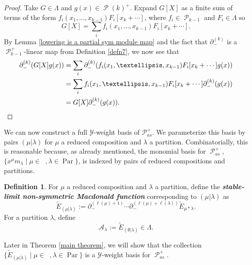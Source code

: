 \documentclass[11pt]{article}
\theoremstyle{definition}
\newtheorem{defi}[theo]{Definition}
\numberwithin{equation}{section}
\newcommand{\y}{{ \mathscr{Y} }}
\DeclareMathOperator{\sP}{\mathscr{P} }
\DeclareMathOperator{\Par}{\mathrm{Par}}
\DeclareMathOperator{\Compred}{\mathrm{Comp}^{\textit{red}}}
\begin{document}
\begin{proof}
    Take $G \in \Lambda$ and $g(x) \in \sP(k)^{+}$. Expand $G[X]$ as a finite sum of terms of the form $f_i(x_1,\ldots,x_{k-1})F_i[x_k + \cdots]$, where $f_i \in \sP_{k-1}$ and $F_i \in \Lambda$ so 
    $$G[X] = \sum_{i} f_i(x_1,\ldots,x_{k-1})F_i[x_k + \cdots].$$
    By Lemma \ref{lowering is a partial sym module map} and the fact that $\partial_{-}^{(k)}$ is a $\sP_{k-1}^{+}$-linear map from Definition \ref{defn7}, we now see that 
\begin{align*}
    \partial_{-}^{(k)}(G[X]g(x)) &= 
    \sum_{i} \partial_{-}^{(k)}( f_i(x_1,\ldots,x_{k-1})F_i[x_k + \cdots]g(x)) \\
    &= \sum_{i} f_i(x_1,\ldots,x_{k-1})F_i[x_k + \cdots]\partial_{-}^{(k)}(g(x)) \\
    &= G[X]\partial_{-}^{(k)}(g(x)). \qedhere
\end{align*}
\end{proof}

We can now construct a full $\y$-weight basis of $\mathscr{P}_{as}^{+}$. We parameterize this basis by pairs $(\mu | \lambda)$ for $\mu$ a reduced composition and $\lambda$ a partition. Combinatorially, this is reasonable because, as already mentioned, the monomial basis for $\sP_{as}^{+}$, $\{x^{\mu}m_{\lambda} \mid \mu \in \Compred, \lambda \in \Par\}$, is indexed by pairs of reduced compositions and partitions.

\begin{defi} \label{defn9}
For $\mu$ a reduced composition and $\lambda$ a partition, define the \textbf{\textit{stable-limit non-symmetric Macdonald function}} corresponding to $(\mu|\lambda)$ as
\begin{equation}
    \widetilde{E}_{(\mu|\lambda)} :=  \partial_{-}^{(\ell(\mu)+1)}\cdots \partial_{-}^{(\ell(\mu)+\ell(
\lambda))} \widetilde{E}_{\mu*\lambda}.
\end{equation}
For a partition $\lambda$, define
\begin{equation}\label{A-Lambda basis}
\mathcal{A}_{\lambda} := \widetilde{E}_{(\emptyset|\lambda)} \in \Lambda .
\end{equation}

\end{defi}

Later in Theorem \ref{main theorem}, we will show that the collection $\{\widetilde{E}_{(\mu|\lambda)} \mid \mu \in \Compred, \lambda \in \Par\}$ is a $\y$-weight basis for $\sP_{as}^{+}.$
\end{document}
